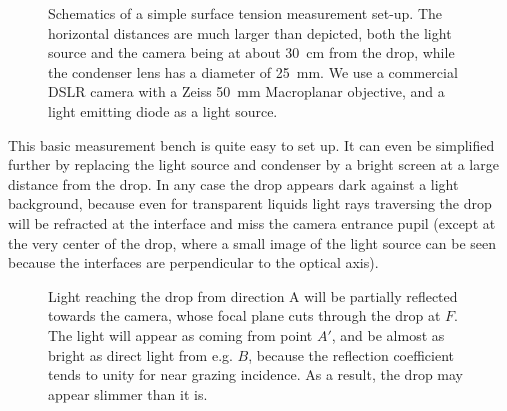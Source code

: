 \documentclass[fleqn]{scrartcl}
\begin{document}
\begin{figure}
  
  \caption{Schematics of a simple surface tension measurement set-up.
    The horizontal distances are much larger than depicted, both the
    light source and the camera being at about \SI{30}{\centi\metre}
    from the drop, while the condenser lens has a diameter of
    \SI{25}{\milli\metre}. We use a commercial DSLR camera with a
    Zeiss \SI{50}{\milli\metre} Macroplanar objective, and a light
    emitting diode as a light source.}
  \label{fig:setup}
\end{figure}

This basic measurement bench is quite easy to set up. It can even be
simplified further by replacing the light source and condenser by a
bright screen at a large distance from the drop. In any case the drop
appears dark against a light background, because even for transparent
liquids light rays traversing the drop will be refracted at the
interface and miss the camera entrance pupil (except at the very
center of the drop, where a small image of the light source can be
seen because the interfaces are perpendicular to the optical axis). 

\begin{figure}
  \centering
  \caption{Light reaching the drop from direction A will be partially
    reflected towards the camera, whose focal plane cuts through the
    drop at $F$. The light will appear as coming from point $A'$, and
    be almost as bright as direct light from e.g. $B$, because the
    reflection coefficient tends to unity for near grazing incidence.
    As a result, the drop may appear slimmer than it is.}
  \label{fig:grazing}
\end{figure}
\end{document}
